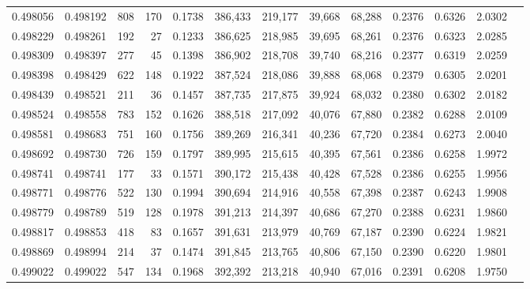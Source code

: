 \begin{tabular}{rrrrrrrrrrrrr}
0.498056 & 0.498192 &   808 &   170 &                                     0.1738 & 386,433 & 219,177 &  39,668 &  68,288 & 0.2376 & 0.6326 & 2.0302 \\
0.498229 & 0.498261 &   192 &    27 &                                     0.1233 & 386,625 & 218,985 &  39,695 &  68,261 & 0.2376 & 0.6323 & 2.0285 \\
0.498309 & 0.498397 &   277 &    45 &                                     0.1398 & 386,902 & 218,708 &  39,740 &  68,216 & 0.2377 & 0.6319 & 2.0259 \\
0.498398 & 0.498429 &   622 &   148 &                                     0.1922 & 387,524 & 218,086 &  39,888 &  68,068 & 0.2379 & 0.6305 & 2.0201 \\
0.498439 & 0.498521 &   211 &    36 &                                     0.1457 & 387,735 & 217,875 &  39,924 &  68,032 & 0.2380 & 0.6302 & 2.0182 \\
0.498524 & 0.498558 &   783 &   152 &                                     0.1626 & 388,518 & 217,092 &  40,076 &  67,880 & 0.2382 & 0.6288 & 2.0109 \\
0.498581 & 0.498683 &   751 &   160 &                                     0.1756 & 389,269 & 216,341 &  40,236 &  67,720 & 0.2384 & 0.6273 & 2.0040 \\
0.498692 & 0.498730 &   726 &   159 &                                     0.1797 & 389,995 & 215,615 &  40,395 &  67,561 & 0.2386 & 0.6258 & 1.9972 \\
0.498741 & 0.498741 &   177 &    33 &                                     0.1571 & 390,172 & 215,438 &  40,428 &  67,528 & 0.2386 & 0.6255 & 1.9956 \\
0.498771 & 0.498776 &   522 &   130 &                                     0.1994 & 390,694 & 214,916 &  40,558 &  67,398 & 0.2387 & 0.6243 & 1.9908 \\
0.498779 & 0.498789 &   519 &   128 &                                     0.1978 & 391,213 & 214,397 &  40,686 &  67,270 & 0.2388 & 0.6231 & 1.9860 \\
0.498817 & 0.498853 &   418 &    83 &                                     0.1657 & 391,631 & 213,979 &  40,769 &  67,187 & 0.2390 & 0.6224 & 1.9821 \\
0.498869 & 0.498994 &   214 &    37 &                                     0.1474 & 391,845 & 213,765 &  40,806 &  67,150 & 0.2390 & 0.6220 & 1.9801 \\
0.499022 & 0.499022 &   547 &   134 &                                     0.1968 & 392,392 & 213,218 &  40,940 &  67,016 & 0.2391 & 0.6208 & 1.9750 \\

\end{tabular}
